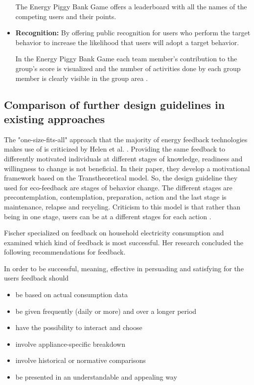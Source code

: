 \begin{itemize}
	The Energy Piggy Bank Game \cite{Bjorn1165339} offers a leaderboard with all the names of the competing users and their points.
	
	\item \textbf{Recognition:}
	By offering public recognition for users who perform the target behavior to increase the likelihood that users will adopt a target behavior.
	
	In the Energy Piggy Bank Game each team member’s contribution to the group’s score is visualized and the number of activities done by each group member is clearly visible in the group area \cite{Bjorn1165339}.
	
\end{itemize}

\subsection{Comparison of further design guidelines in existing approaches}

The "one-size-fits-all" approach that the majority of energy feedback technologies makes use of is criticized by Helen et al. \cite{he2010one}. Providing the same feedback to differently motivated individuals at different stages of knowledge, readiness and willingness to change is not beneficial. In their paper, they develop a motivational framework based on the Transtheoretical model. So, the design guideline they used for eco-feedback are stages of behavior change. The different stages are precontemplation, contemplation, preparation, action and the last stage is maintenance, relapse and recycling. Criticism to this model is that rather than being in one stage, users can be at a different stages for each action \cite{mcconnaughy1983stages}.

Fischer \cite{fischer2008feedback} specialized on feedback on household electricity consumption and examined which kind of feedback is most successful. Her research concluded the following recommendations for feedback.

In order to be successful, meaning, effective in persuading and satisfying for the users feedback should
\begin{itemize}
	\item be based on actual consumption data
	\item be given frequently (daily or more) and over a longer period
	\item have the possibility to interact and choose
	\item involve appliance-specific breakdown
	\item involve historical or normative comparisons
	\item be presented in an understandable and appealing
	way
\end{itemize}


